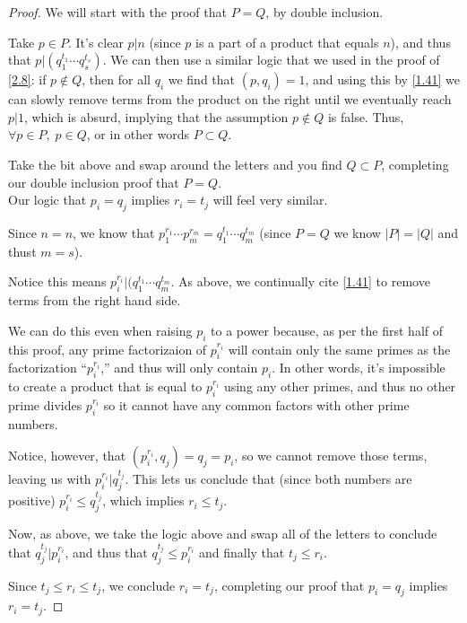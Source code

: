 \documentclass{article}
\numberwithin{equation}{thm}
\begin{document}
\begin{proof}
  We will start with the proof that $P = Q$, by double inclusion.

  Take $p \in P$. It's clear $p | n$ (since $p$ is a part of a product that equals $n$), and thus that $p | (q_1^{t_1} \cdots q_s^{t_s})$. We can then use a similar logic that we used in the proof of \ref{2.8}: if $p \not \in Q$, then for all $q_i$ we find that $(p, q_i) = 1$, and using this by \ref{1.41} we can slowly remove terms from the product on the right until we eventually reach $p | 1$, which is absurd, implying that the assumption $p \not \in Q$ is false. Thus, $\forall p \in P, \; p \in Q$, or in other words $P \subset Q$.

  Take the bit above and swap around the letters and you find $Q \subset P$, completing our double inclusion proof that $P = Q$. \\[0ex]

   Our logic that $p_i = q_j$ implies $r_i = t_j$ will feel very similar.

   Since $n=n$, we know that $p_1^{r_1} \cdots p_m^{r_m} = q_1^{t_1} \cdots q_m^{t_m}$ (since $P = Q$ we know $|P| = |Q|$ and thust $m = s$).

   Notice this means $p_i^{r_i} | (q_1^{t_1} \cdots q_m^{t_m}$. As above, we continually cite \ref{1.41} to remove terms from the right hand side.

   We can do this even when raising $p_i$ to a power because, as per the first half of this proof, any prime factorizaion of $p_i^{r_i}$ will contain only the same primes as the factorization ``$p_i^{r_i}$,'' and thus will only contain $p_i$. In other words, it's impossible to create a product that is equal to $p_i^{r_i}$ using any other primes, and thus no other prime divides $p_i^{r_i}$ so it cannot have any common factors with other prime numbers.

   Notice, however, that $(p_i^{r_i}, q_j) = q_j = p_i$, so we cannot remove those terms, leaving us with $p_i^{r_i} | q_j^{t_j}$. This lets us conclude that (since both numbers are positive) $p_i^{r_i} \leq q_j^{t_j}$, which implies $r_i \leq t_j$.

   Now, as above, we take the logic above and swap all of the letters to conclude that $q_j^{t_j} | p_i^{r_i}$, and thus that $q_j^{t_j} \leq p_i^{r_i}$ and finally that $t_j \leq r_i$.

   Since $t_j \leq r_i \leq t_j$, we conclude $r_i = t_j$, completing our proof that $p_i = q_j$ implies $r_i = t_j$.
\end{proof}
\end{document}
